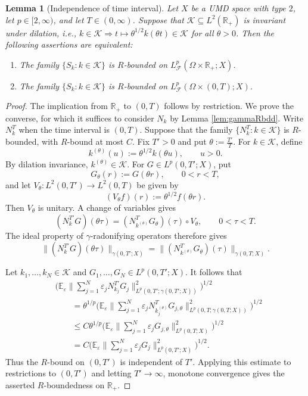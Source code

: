 \documentclass[10pt,a4paper]{amsart}
\newtheorem{lemma}{Lemma}
\newcommand{\E}{\mathbb E}
\newcommand{\R}{\mathbb R}
\begin{document}
\begin{lemma}[Independence of time interval]\label{lemma:timeintervalSp}
Let $X$ be a UMD space with type $2$, let
$p\in[2,\infty)$, and let $T\in (0,\infty)$. Suppose that $\mathcal{K}\subseteq L^2(\R_+)$ is invariant under dilation, i.e., $k\in \mathcal{K} \Rightarrow t\mapsto \theta^{1/2} k(\theta t)\in \mathcal{K}$ for all $\theta>0$. Then the following assertions are equivalent:
\begin{enumerate}[label={\rm(\arabic*)}, leftmargin=*]
\item The family $\{S_k:k\in \mathcal{K}\}$ is $R$-bounded on $L^p_{\mathscr F}(\Omega\times\mathbb R_+;X)$.
\item The family $\{S_k:k\in \mathcal{K}\}$ is $R$-bounded on $L^p_{\mathscr F}(\Omega\times(0,T);X)$.
\end{enumerate}
\end{lemma}

\begin{proof}
The implication from $\R_+$ to $(0,T)$ follows by restriction. We prove the converse, for which it suffices to consider $N_k$ by Lemma \ref{lem:gammaRbdd}.  Write $N_k^T$ when the time interval is $(0,T)$. Suppose that the family
$\{N_k^T:k\in\mathcal K\}$
is $R$-bounded, with $R$-bound at most $C$.
Fix $T'>0$ and put $\theta:=\frac{T'}{T}.$ For $k\in\mathcal K$, define
\[
        k^{(\theta)}(u):=\theta^{1/2}k(\theta u), \qquad u>0.
\]
By dilation invariance, $k^{(\theta)}\in\mathcal K$. For
$G\in L^p(0,T';X)$, put
\[
        G_\theta(r):=G(\theta r),
        \qquad 0<r<T,
\]
and let $V_\theta:L^2(0,T')\longrightarrow L^2(0,T)$ be given by
\[
        (V_\theta f)(r):=\theta^{1/2}f(\theta r).
\]
Then $V_\theta$ is unitary. A change of variables gives
\[
        (N_k^{T'}G)(\theta\tau)
        =
        (N_{k^{(\theta)}}^TG_\theta)(\tau)\circ V_\theta,
        \qquad 0<\tau<T.
\]
The ideal property of $\gamma$-radonifying operators therefore gives
\[
        \|(N_k^{T'}G)(\theta\tau)\|_{\gamma(0,T';X)}
        =
        \|(N_{k^{(\theta)}}^TG_\theta)(\tau)\|_{\gamma(0,T;X)}.
\]

Let $k_1,\ldots,k_N\in\mathcal K$ and
$G_1,\ldots,G_N\in L^p(0,T';X)$. It follows that
\[
\begin{aligned}
&\Big(
\E_\varepsilon
\Big\|
\sum_{j=1}^N\varepsilon_jN_{k_j}^{T'}G_j
\Big\|_{L^p(0,T';\gamma(0,T';X))}^2
\Big)^{1/2}
\\
&\qquad
=
\theta^{1/p}
\Big(
\E_\varepsilon
\Big\|
\sum_{j=1}^N
\varepsilon_jN_{k_j^{(\theta)}}^TG_{j,\theta}
\Big\|_{L^p(0,T;\gamma(0,T;X))}^2
\Big)^{1/2}
\\
&\qquad
\leq
C\theta^{1/p}
\Big(
\E_\varepsilon
\Big\|
\sum_{j=1}^N\varepsilon_jG_{j,\theta}
\Big\|_{L^p(0,T;X)}^2
\Big)^{1/2}
\\
&\qquad
=
C
\Big(
\E_\varepsilon
\Big\|
\sum_{j=1}^N\varepsilon_jG_j
\Big\|_{L^p(0,T';X)}^2
\Big)^{1/2}.
\end{aligned}
\]
Thus the $R$-bound on $(0,T')$ is independent of $T'$. Applying this estimate to restrictions to $(0,T')$ and letting $T'\to\infty$, monotone convergence gives the asserted $R$-boundedness on $\R_+$. 
\end{proof}
\end{document}

